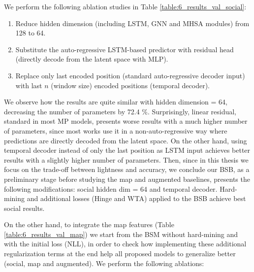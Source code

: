 We perform the following ablation studies in Table \ref{table:6_results_val_social}: 

\begin{enumerate}
	
	\item Reduce hidden dimension (including \ac{LSTM}, \ac{GNN} and \ac{MHSA} modules) from 128 to 64.
	
	\item Substitute the auto-regressive \ac{LSTM}-based predictor with residual head (directly decode from the latent space with \ac{MLP}).
	
	\item Replace only last encoded position (standard auto-regressive decoder input) with last $n$ (window size) encoded positions (temporal decoder).
	
\end{enumerate}

We observe how the results are quite similar with hidden dimension = 64, decreasing the number of parameters by 72.4 \%. Surprisingly, linear residual, standard in most \ac{MP} models, presents worse results with a much higher number of parameters, since most works use it in a non-auto-regressive way where predictions are directly decoded from the latent space. On the other hand, using temporal decoder instead of only the last position as \ac{LSTM} input achieves better results with a slightly higher number of parameters. Then, since in this thesis we focus on the trade-off between lightness and accuracy, we conclude our \acf{BSB}, as a preliminary stage before studying the map and augmented baselines, presents the following modifications: social hidden dim = 64 and temporal decoder. Hard-mining and additional losses (Hinge and \ac{WTA}) applied to the \acf{BSB} achieve best social results.

On the other hand, to integrate the map features (Table \ref{table:6_results_val_map}) we start from the BSM without hard-mining and with the initial loss (\ac{NLL}), in order to check how implementing these additional regularization terms at the end help all proposed models to generalize better (social, map and augmented). We perform the following ablations: 

